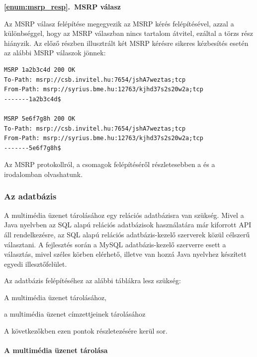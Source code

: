 \noindent
{\bf \ref{enum:msrp_resp}.~MSRP válasz}

Az MSRP válasz felépítése megegyezik az MSRP kérés felépítésével, azzal a különbséggel, hogy az MSRP válaszban nincs tartalom átvitel, ezáltal a törzs rész hiányzik. Az előző részben illusztrált két MSRP kérésre sikeres kézbesítés esetén az alábbi MSRP válaszok jönnek:
\fontsize{10}{10}
\begin{verbatim}
MSRP 1a2b3c4d 200 OK
To-Path: msrp://csb.invitel.hu:7654/jshA7weztas;tcp
From-Path: msrp://syrius.bme.hu:12763/kjhd37s2s20w2a;tcp
-------1a2b3c4d$

MSRP 5e6f7g8h 200 OK
To-Path: msrp://csb.invitel.hu:7654/jshA7weztas;tcp
From-Path: msrp://syrius.bme.hu:12763/kjhd37s2s20w2a;tcp
-------5e6f7g8h$
\end{verbatim}
\fontsize{12}{12} 

\bigskip

Az MSRP protokollról, a csomagok felépítéséről részletesebben a \cite{rfc4975} és a \cite{rfc4976} irodalomban olvashatunk.

\subsubsection{Az adatbázis}
\label{sec:adatb}

A multimédia üzenet tárolásához egy relációs adatbázisra van szükség. Mivel a Java nyelvben az SQL alapú relációs adatbázisok használatára már kiforrott API áll rendelkezésre, az SQL alapú relációs adatbázis-kezelő szerverek közül célszerű választani. A fejlesztés során a MySQL adatbázis-kezelő szerverre esett a választás, mivel széles körben elérhető, illetve van hozzá Java nyelvhez készített egyedi illesztőfelület.

Az adatbázis felépítéséhez az alábbi táblákra lesz szükség:

\begin{myitemize}
\item A multimédia üzenet tárolásához,
\item a multimédia üzenet címzettjeinek tárolásához
\end{myitemize}

A következőkben ezen pontok részletezésére kerül sor.

\paragraph*{A multimédia üzenet tárolása\\}

